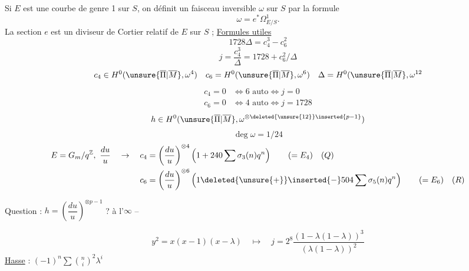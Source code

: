 Si $E$ est une courbe de genre 1 sur $S$, on définit un faisceau inversible $\omega$ sur $S$ par la formule
\[
\omega=e^*\Omega^1_{E/S}.
\]
La section $e$ est un diviseur de Cortier relatif de $E$ sur $S$ ;
\uline{Formules utiles}
\[
1728\Delta=c_4^3-c_6^2
\]
\[
j=\frac{c_4^3}{\Delta}=1728+c_6^2/\Delta
\]
\[
c_4\in H^0(\unsure{\overline{\Pi}|\overline{M}},\omega^4)\quad
c_6=H^0(\unsure{\overline{\Pi}|\overline{M}},\omega^6)\quad
\Delta=H^0(\unsure{\overline{\Pi}|\overline{M}},\omega^{12}
\]
\[
\begin{aligned}
c_4=0&\Longleftrightarrow 6\text{ auto}\Longleftrightarrow j=0\\
c_6=0&\Longleftrightarrow 4\text{ auto}\Longleftrightarrow j=1728
\end{aligned}
\]
\[
h\in H^0(\unsure{\overline{\Pi}|\overline{M}},\omega^{\otimes\deleted{\unsure{12}}\inserted{p-1}})
\]
\[
\deg\omega=1/24
\]
\[
\begin{aligned}
E=G_m/q^{\mathbb Z},\ \frac{du}{u}\quad\to\quad
c_4&=\left(\frac{du}{u}\right)^{\otimes4}\left(1+240\sum\sigma_3(n)q^n\right)\qquad(=E_4)\quad(Q)\\
c_6&=\left(\frac{du}{u}\right)^{\otimes6}\left(1\deleted{\unsure{+}}\inserted{-}504\sum\sigma_5(n)q^n\right)\qquad(=E_6)\quad(R)
\end{aligned}
\]

Question : $h=\left(\dfrac{du}{u}\right)^{\otimes p-1}$ ? à l'$\infty$ --

\[
y^2=x(x-1)(x-\lambda)\quad\longmapsto\quad j=2^8\frac{(1-\lambda(1-\lambda))^3}{(\lambda(1-\lambda))^2}
\]
\uline{Hasse} : $(-1)^n\sum\binom{n}{i}^2\lambda^i$

